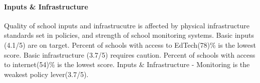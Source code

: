 \documentclass[twocolumn]{article}
\let\oldparagraph\paragraph
\renewcommand{\paragraph}[1]{\oldparagraph{#1}\mbox{}}
\begin{document}
\hypertarget{inputs-infrastructure}{%
\paragraph{\texorpdfstring{\textbf{Inputs \&
Infrastructure}}{Inputs \& Infrastructure}}\label{inputs-infrastructure}}

Quality of school inputs and infrastrucutre is affected by physical
infrastructure standards set in policies, and strength of school
monitoring systems. Basic inputs (4.1/5) are on target. Percent of
schools with access to EdTech(78)\% is the lowest score. Basic
infrastructure (3.7/5) requires caution. Percent of schools with access
to internet(54)\% is the lowest score. Inputs \& Infrastructure -
Monitoring is the weakest policy lever(3.7/5).

\begin{table}[H]
\end{table}
\end{document}
